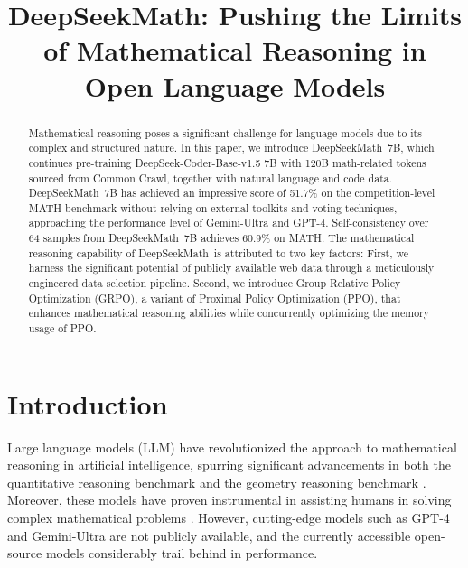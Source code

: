 \title{DeepSeekMath: Pushing the Limits of Mathematical Reasoning in Open Language Models}

\begin{abstract}
Mathematical reasoning poses a significant challenge for language models due to its complex and structured nature. In this paper, we introduce DeepSeekMath~7B, which continues pre-training DeepSeek-Coder-Base-v1.5 7B  with 120B math-related tokens sourced from Common Crawl, together with natural language and code data. DeepSeekMath~7B has achieved an impressive score of 51.7\% on the competition-level MATH benchmark without relying on external toolkits and voting techniques, approaching the performance level of Gemini-Ultra and GPT-4.  Self-consistency over 64 samples from DeepSeekMath~7B achieves 60.9\% on MATH. The mathematical reasoning capability of DeepSeekMath~is attributed to two key factors: First, we harness the significant potential of publicly available web data through a meticulously engineered data selection pipeline. Second, we introduce Group Relative Policy Optimization (GRPO), a variant of Proximal Policy Optimization (PPO), that enhances mathematical reasoning abilities while concurrently optimizing the memory usage of PPO.
\end{abstract}

\section{Introduction}

Large language models (LLM) have revolutionized the approach to mathematical reasoning in artificial intelligence, spurring significant advancements in both the quantitative reasoning benchmark \citep{MATH} and the geometry reasoning benchmark \citep{trinh2024solving}. Moreover, these models have proven instrumental in assisting humans in solving complex mathematical problems \citep{tao}. However, cutting-edge models such as GPT-4 \citep{gpt4} and Gemini-Ultra \citep{gemini} are not publicly available, and the currently accessible open-source models considerably trail behind in performance.

